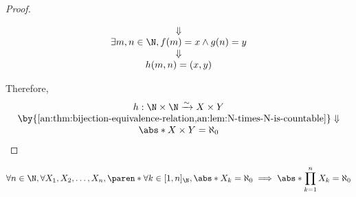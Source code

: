\begin{proof}
\begin{itemize}
\[\begin{array}{c}
              \Downarrow                                                  \\
              \exists m, n \in \N, f(m) = x \land g(n) = y                \\
              \Downarrow                                                  \\
              h(m, n) = (x, y)
            \end{array}
          \]
  \end{itemize}
  Therefore,
  \[
    \begin{array}{c}
      h: \N \times \N \xrightarrow{\sim} X \times Y                                              \\
      \by{\Cref{an:thm:bijection-equivalence-relation,an:lem:N-times-N-is-countable}} \Downarrow \\
      \abs*{X \times Y} = \aleph_{0}
    \end{array}
  \]
\end{proof}

\bigskip

\begin{theorem} \label{an:thm:product-of-finite-countable-sets-is-countable}
  \[
    \forall n \in \N, \forall X_{1}, X_{2}, \dots, X_{n},
    \paren*{\forall k \in [1, n]_{\N}, \abs*{X_{k}} = \aleph_{0}}
    \implies \abs*{\prod_{k = 1}^{n} X_{k}} = \aleph_{0}
  \]
\end{theorem}

